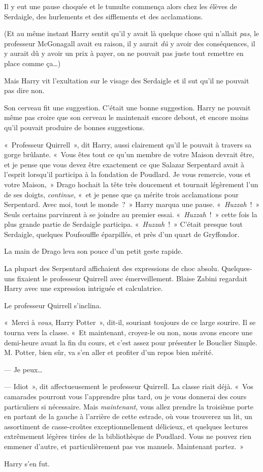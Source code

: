 Il y eut une pause choquée et le tumulte commença alors chez les élèves de Serdaigle, des hurlements et des sifflements et des acclamations.

(Et au même instant Harry sentit qu'il y avait là quelque chose qui n'allait \emph{pas}, le professeur McGonagall avait eu raison, il y aurait \emph{dû} y avoir des conséquences, il y aurait dû y avoir un prix à payer, on ne pouvait pas juste tout remettre en place comme ça…)

Mais Harry vit l'exultation sur le visage des Serdaigle et il sut qu'il ne pouvait pas dire non.

Son cerveau fit une suggestion.
C'était une bonne suggestion.
Harry ne pouvait même pas croire que son cerveau le maintenait encore debout, et encore moins qu'il pouvait produire de bonnes suggestions.

«~Professeur Quirrell~», dit Harry, aussi clairement qu'il le pouvait à travers sa gorge brûlante.
«~Vous êtes tout ce qu'un membre de votre Maison devrait être, et je pense que vous devez être exactement ce que Salazar Serpentard avait à l'esprit lorsqu'il participa à la fondation de Poudlard.
Je vous remercie, vous et votre Maison,~» Drago hochait la tête très doucement et tournait légèrement l'un de ses doigts, \emph{continue}, «~et je pense que ça mérite trois acclamations pour Serpentard.
Avec moi, tout le monde~?~»
Harry marqua une pause.
«~\emph{Huzzah}~!~»
 Seuls certains parvinrent à se joindre au premier essai.
«~\emph{Huzzah}~!~»
cette fois la plus grande partie de Serdaigle participa.
«~\emph{Huzzah}~!~»
C'était presque tout Serdaigle, quelques Poufsouffle éparpillés, et près d'un quart de Gryffondor.

La main de Drago leva son pouce d'un petit geste rapide.

La plupart des Serpentard affichaient des expressions de choc absolu.
Quelques-uns fixaient le professeur Quirrell avec émerveillement.
Blaise Zabini regardait Harry avec une expression intriguée et calculatrice.

Le professeur Quirrell s'inclina.

«~Merci à \emph{vous}, Harry Potter~», dit-il, souriant toujours de ce large sourire.
Il se tourna vers la classe.
«~Et maintenant, croyez-le ou non, nous avons encore une demi-heure avant la fin du cours, et c'est assez pour présenter le Bouclier Simple.
M. Potter, bien sûr, va s'en aller et profiter d'un repos bien mérité.

--- Je peux…

--- Idiot~», dit affectueusement le professeur Quirrell.
La classe riait déjà.
«~Vos camarades pourront vous l'apprendre plus tard, ou je vous donnerai des cours particuliers si nécessaire.
Mais \emph{maintenant}, vous allez prendre la troisième porte en partant de la gauche à l'arrière de cette estrade, où vous trouverez un lit, un assortiment de casse-croûtes exceptionnellement délicieux, et quelques lectures extrêmement légères tirées de la bibliothèque de Poudlard.
Vous ne pouvez rien emmener d'autre, et particulièrement pas vos manuels.
Maintenant partez.~»

Harry s'en fut.
